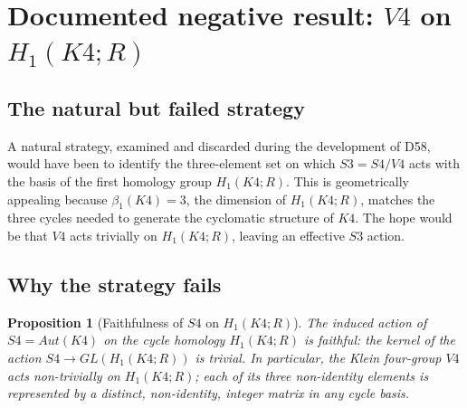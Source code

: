 \documentclass[11pt,a4paper]{article}
\def\Sfour{S4}%
\def\Vfour{V4}%
\def\Sthree{S3}%
\def\Kfour{K4}%
\def\Aut{Aut}%
\def\GL{GL}%
\def\RR{R}%
\def\mathbb#1{#1}%
\def\mathrm#1{#1}%
\theoremstyle{plain}
\newtheorem{proposition}[theorem]{Proposition}
\theoremstyle{definition}
\theoremstyle{remark}
\newcommand{\Kfour}{K_4}
\newcommand{\Sfour}{S_4}
\newcommand{\Vfour}{V_4}
\newcommand{\Sthree}{S_3}
\newcommand{\Aut}{\mathrm{Aut}}
\newcommand{\GL}{\mathrm{GL}}
\newcommand{\RR}{\mathbb{R}}
\begin{document}
\section{Documented negative result: \texorpdfstring{$\Vfour$}{V4} on \texorpdfstring{$H_1(\Kfour;\RR)$}{H1(K4;R)}}
\label{sec:negative}

\subsection{The natural but failed strategy}

A natural strategy, examined and discarded during the development of D58, would have been to identify the three-element set on which $\Sthree = \Sfour/\Vfour$ acts with the basis of the first homology group $H_1(\Kfour;\RR)$. This is geometrically appealing because $\beta_1(\Kfour) = 3$, the dimension of $H_1(\Kfour;\RR)$, matches the three cycles needed to generate the cyclomatic structure of $\Kfour$. The hope would be that $\Vfour$ acts trivially on $H_1(\Kfour;\RR)$, leaving an effective $\Sthree$ action.

\subsection{Why the strategy fails}

\begin{proposition}[Faithfulness of $\Sfour$ on $H_1(\Kfour;\RR)$]
\label{prop:negative}
The induced action of $\Sfour = \Aut(\Kfour)$ on the cycle homology $H_1(\Kfour;\RR)$ is faithful: the kernel of the action $\Sfour \to \GL(H_1(\Kfour;\RR))$ is trivial. In particular, the Klein four-group $\Vfour$ acts non-trivially on $H_1(\Kfour;\RR)$; each of its three non-identity elements is represented by a distinct, non-identity, integer matrix in any cycle basis.
\end{proposition}
\end{document}
